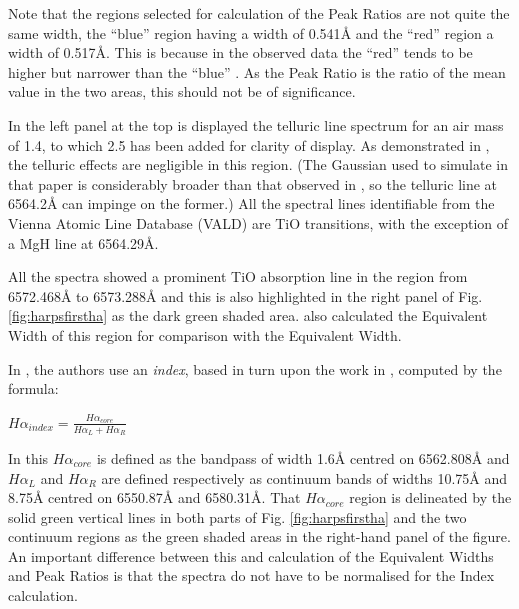 Note that the regions selected for calculation of the Peak Ratios are not quite the same width, the ``blue'' \horn{}
region having a width of 0.541{\AA} and the ``red'' {\horn} region a width of 0.517\AA. This is because in the observed
data the ``red'' {\horn} tends to be higher but narrower than the ``blue'' \horn. As the Peak Ratio is the ratio of the
mean value in the two areas, this should not be of significance.

In the left panel at the top is displayed the telluric line spectrum for an air mass of 1.4, to which 2.5 has been added
for clarity of display. As demonstrated in \citet[Fig. 1]{reiners15}, the telluric effects are negligible in this
region. (The Gaussian used to simulate {\ha} in that paper is considerably broader than that observed in \prox, so the
telluric line at 6564.2{\AA} can impinge on the former.) All the spectral lines identifiable from the Vienna Atomic Line
Database (VALD) are TiO transitions, with the exception of a MgH line at 6564.29\AA.

All the spectra showed a prominent TiO absorption line in the region from 6572.468{\AA} to 6573.288{\AA} and this is
also highlighted in the right panel of Fig. \ref{fig:harpsfirstha} as the dark green shaded area. {\FirstP} also
calculated the Equivalent Width of this region for comparison with the {\ha} Equivalent Width.

In \citet{suarezmascareno15}, the authors use an \textit{{\ha} index}, based in turn upon the work in
\citet{gomesdasilva11}, computed by the formula:

\begin{center}

$ H\alpha_{index} = \frac{H\alpha_{core}}{H\alpha_L + H\alpha_R} $

\end{center}

In this $ H\alpha_{core} $ is defined as the bandpass of width 1.6{\AA} centred on 6562.808{\AA} and $ H\alpha_L $ and
$H \alpha_R $ are defined respectively as continuum bands of widths 10.75{\AA} and 8.75{\AA} centred on 6550.87{\AA} and
6580.31\AA. That $ H\alpha_{core} $ region is delineated by the solid green vertical lines in both parts of
Fig. \ref{fig:harpsfirstha} and the two continuum regions as the green shaded areas in the right-hand panel of the
figure. An important difference between this and calculation of the Equivalent Widths and Peak Ratios is that the
spectra do not have to be normalised for the {\ha} Index calculation.

